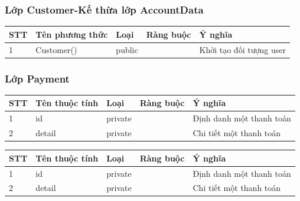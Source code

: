 \documentclass[a4paper, 12pt]{article}
\begin{document}
\subsubsection{Lớp Customer-Kế thừa lớp AccountData}
\begin{table}[H]
\centering
	\begin{tabular}{|l|l|l|l|l|}
		\hline
		STT & Tên phương thức          & Loại   & Ràng buộc & Ý nghĩa                                                                           \\ \hline
		1   & Customer() 				   & public &           & Khởi tạo đối tượng user \\ \hline
	\end{tabular}
\end{table}

\subsubsection{Lớp Payment}
\begin{table}[H]
\centering
\begin{tabular}{|l|l|l|l|l|}
\hline
STT & Tên thuộc tính & Loại    & Ràng buộc & Ý nghĩa                  \\ \hline
1   & id             & private &           & Định danh một thanh toán \\ \hline
2   & detail         & private &           & Chi tiết một thanh toán  \\ \hline
\end{tabular}
\end{table}
\begin{table}[H]
\centering
\begin{tabular}{|l|l|l|l|l|}
\hline
STT & Tên thuộc tính & Loại    & Ràng buộc & Ý nghĩa                  \\ \hline
1   & id             & private &           & Định danh một thanh toán \\ \hline
2   & detail         & private &           & Chi tiết một thanh toán  \\ \hline
\end{tabular}
\end{table}
\end{document}
